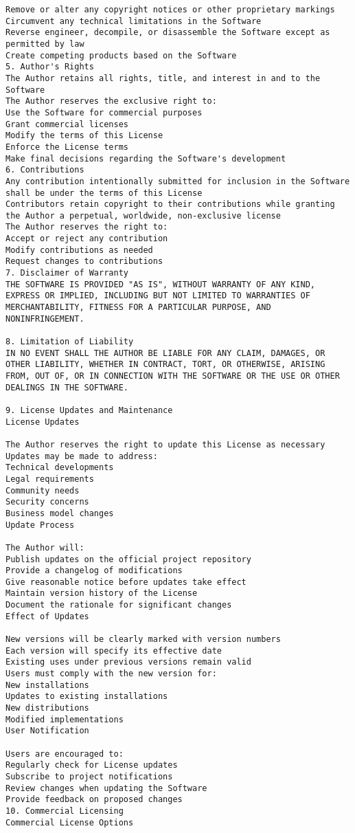 \begin{verbatim}
Remove or alter any copyright notices or other proprietary markings
Circumvent any technical limitations in the Software
Reverse engineer, decompile, or disassemble the Software except as permitted by law
Create competing products based on the Software
5. Author's Rights
The Author retains all rights, title, and interest in and to the Software
The Author reserves the exclusive right to:
Use the Software for commercial purposes
Grant commercial licenses
Modify the terms of this License
Enforce the License terms
Make final decisions regarding the Software's development
6. Contributions
Any contribution intentionally submitted for inclusion in the Software shall be under the terms of this License
Contributors retain copyright to their contributions while granting the Author a perpetual, worldwide, non-exclusive license
The Author reserves the right to:
Accept or reject any contribution
Modify contributions as needed
Request changes to contributions
7. Disclaimer of Warranty
THE SOFTWARE IS PROVIDED "AS IS", WITHOUT WARRANTY OF ANY KIND, EXPRESS OR IMPLIED, INCLUDING BUT NOT LIMITED TO WARRANTIES OF MERCHANTABILITY, FITNESS FOR A PARTICULAR PURPOSE, AND NONINFRINGEMENT.

8. Limitation of Liability
IN NO EVENT SHALL THE AUTHOR BE LIABLE FOR ANY CLAIM, DAMAGES, OR OTHER LIABILITY, WHETHER IN CONTRACT, TORT, OR OTHERWISE, ARISING FROM, OUT OF, OR IN CONNECTION WITH THE SOFTWARE OR THE USE OR OTHER DEALINGS IN THE SOFTWARE.

9. License Updates and Maintenance
License Updates

The Author reserves the right to update this License as necessary
Updates may be made to address:
Technical developments
Legal requirements
Community needs
Security concerns
Business model changes
Update Process

The Author will:
Publish updates on the official project repository
Provide a changelog of modifications
Give reasonable notice before updates take effect
Maintain version history of the License
Document the rationale for significant changes
Effect of Updates

New versions will be clearly marked with version numbers
Each version will specify its effective date
Existing uses under previous versions remain valid
Users must comply with the new version for:
New installations
Updates to existing installations
New distributions
Modified implementations
User Notification

Users are encouraged to:
Regularly check for License updates
Subscribe to project notifications
Review changes when updating the Software
Provide feedback on proposed changes
10. Commercial Licensing
Commercial License Options


\end{verbatim}
